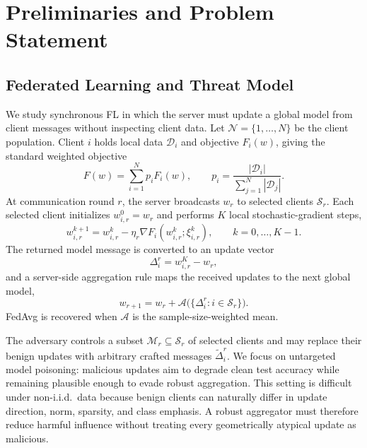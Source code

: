 \documentclass{article}
\begin{document}
\section{Preliminaries and Problem Statement}
\label{sec:problem}

\subsection{Federated Learning and Threat Model}

We study synchronous FL in which the server must update a global model from client messages without inspecting client data. Let $\mathcal{N}=\{1,\dots,N\}$ be the client population. Client $i$ holds local data $\mathcal{D}_i$ and objective $F_i(w)$, giving the standard weighted objective
\begin{equation}
F(w)=\sum_{i=1}^N p_i F_i(w),
\qquad
p_i=\frac{|\mathcal{D}_i|}{\sum_{j=1}^N|\mathcal{D}_j|}.
\label{eq:fl-objective}
\end{equation}
At communication round $r$, the server broadcasts $w_r$ to selected clients $\mathcal{S}_r$. Each selected client initializes $w_{i,r}^{0}=w_r$ and performs $K$ local stochastic-gradient steps,
\begin{equation}
w_{i,r}^{k+1}=w_{i,r}^{k}-\eta_r \nabla F_i(w_{i,r}^{k};\xi_{i,r}^{k}),
\qquad k=0,\dots,K-1.
\label{eq:local-update}
\end{equation}
The returned model message is converted to an update vector
\begin{equation}
\Delta_i^r=w_{i,r}^{K}-w_r,
\label{eq:delta-def}
\end{equation}
and a server-side aggregation rule maps the received updates to the next global model,
\begin{equation}
w_{r+1}=w_r+\mathcal{A}\big(\{\Delta_i^r:i\in\mathcal{S}_r\}\big).
\label{eq:generic-aggregation}
\end{equation}
FedAvg is recovered when $\mathcal{A}$ is the sample-size-weighted mean.

The adversary controls a subset $\mathcal{M}_r\subseteq\mathcal{S}_r$ of selected clients and may replace their benign updates with arbitrary crafted messages $\widetilde{\Delta}_i^r$. We focus on untargeted model poisoning: malicious updates aim to degrade clean test accuracy while remaining plausible enough to evade robust aggregation. This setting is difficult under non-i.i.d.\ data because benign clients can naturally differ in update direction, norm, sparsity, and class emphasis. A robust aggregator must therefore reduce harmful influence without treating every geometrically atypical update as malicious.
\end{document}
